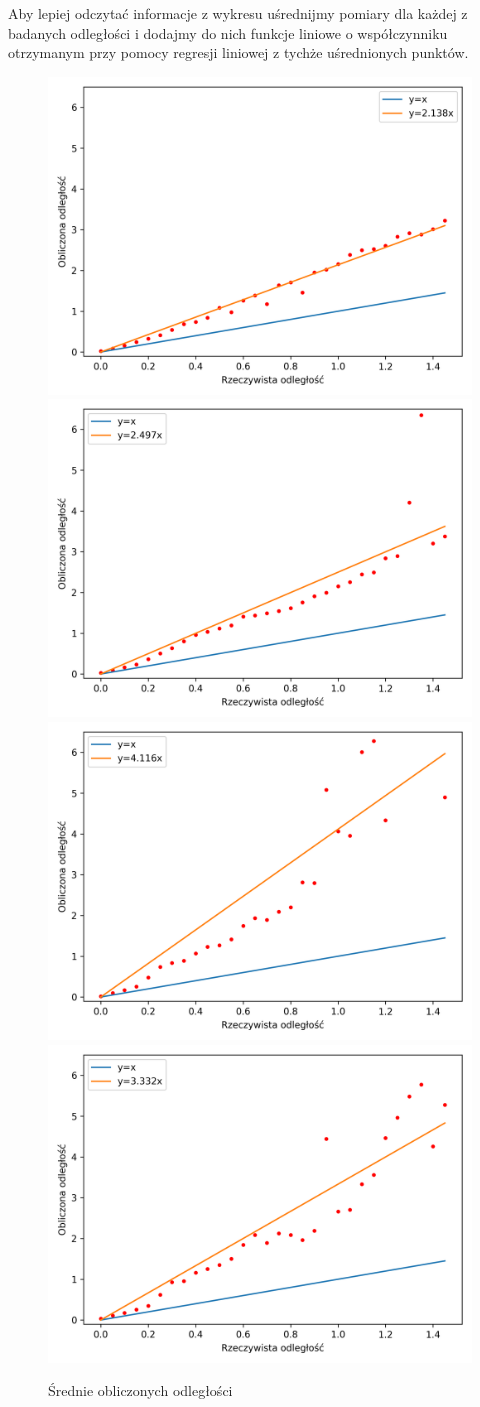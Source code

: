 Aby lepiej odczytać informacje z wykresu uśrednijmy pomiary dla każdej z badanych odległości i dodajmy do nich funkcje liniowe o współczynniku otrzymanym przy pomocy regresji liniowej z tychże uśrednionych punktów.

\begin{figure}[h]
\centering
    \includegraphics[width=.49\textwidth]{pics/mic_sync_dist/dists_close_long_0_mean.png}
    \includegraphics[width=.49\textwidth]{pics/mic_sync_dist/dists_close_long_1_mean.png}
    \includegraphics[width=.49\textwidth]{pics/mic_sync_dist/dists_close_long_2_mean.png}
    \includegraphics[width=.49\textwidth]{pics/mic_sync_dist/dists_close_long_3_mean.png}
\caption{Średnie obliczonych odległości}
\label{pic:slope_test_mean}
\end{figure}

